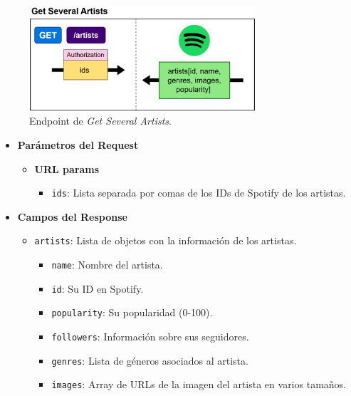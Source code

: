 \begin{figure}[H]
    \centering
    \includegraphics[width=0.75\textwidth]{figures/endpoints/get_several_artists.png}
    \caption{Endpoint de \textit{Get Several Artists}.}
    \label{fig:get_several_artists}
\end{figure}

\begin{itemize}
    \item \textbf{Parámetros del Request}
          \begin{itemize}
              \item \textbf{URL params}
                    \begin{itemize}
                        \item \texttt{ids}: Lista separada por comas de los IDs de Spotify de los artistas.
                    \end{itemize}
          \end{itemize}
    \item \textbf{Campos del Response}
          \begin{itemize}
              \item \texttt{artists}: Lista de objetos con la información de los artistas.
                    \begin{itemize}
                        \item \texttt{name}: Nombre del artista.
                        \item \texttt{id}: Su ID en Spotify.
                        \item \texttt{popularity}: Su popularidad (0-100).
                        \item \texttt{followers}: Información sobre sus seguidores.
                        \item \texttt{genres}: Lista de géneros asociados al artista.
                        \item \texttt{images}: Array de URLs de la imagen del artista en varios tamaños.
                    \end{itemize}
          \end{itemize}
\end{itemize}

